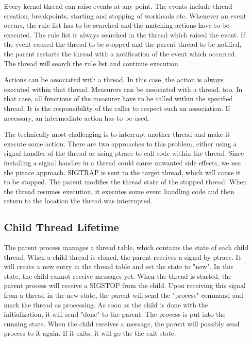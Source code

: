 \documentclass[a4paper,12pt]{article}
\begin{document}
Every kernel thread can raise events at any point. The events include thread creation, breakpoints, starting and stopping of workloads etc. Whenever an event occurs, the rule list has to be searched and the matching actions have to be executed. The rule list is always searched in the thread which raised the event. If the event caused the thread to be stopped and the parent thread to be notified, the parent restarts the thread with a notification of the event which occurred. The thread will search the rule list and continue execution.

Actions can be associated with a thread. In this case, the action is always executed within that thread. Measurers can be associated with a thread, too. In that case, all functions of the measurer have to be called within the specified thread. It is the responsibility of the caller to respect such an association. If necessary, an intermediate action has to be used.

The technically most challenging is to interrupt another thread and make it execute some action. There are two approaches to this problem, either using a signal handler of the thread or using ptrace to call code within the thread. Since installing a signal handler in a thread could cause unwanted side effects, we use the ptrace approach. SIGTRAP is sent to the target thread, which will cause it to be stopped. The parent modifies the thread state of the stopped thread. When the thread resumes execution, it executes some event handling code and then return to the location the thread was interrupted.

\subsection{Child Thread Lifetime}
The parent process manages a thread table, which contains the state of each child thread. When a child thread is cloned, the parent receives a signal by ptrace. It will create a new entry in the thread table and set the state to "new". In this state, the child cannot receive messages yet. When the thread is started, the parent process will receive a SIGSTOP from the child. Upon receiving this signal from a thread in the new state, the parent will send the "process" command and mark the thread as processing. As soon as the child is done with the initialization, it will send "done" to the parent. The process is put into the running state. When the child receives a message, the parent will possibly send process to it again. If it exits, it will go the the exit state.
\listoffigures




\end{document}

